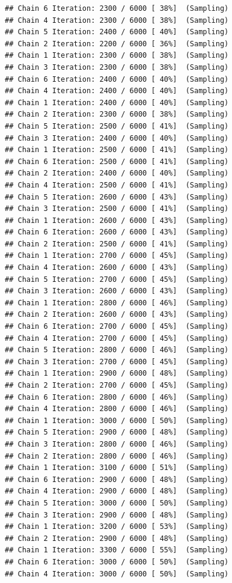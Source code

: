 \documentclass[
]{article}
\begin{document}
\begin{verbatim}
## Chain 6 Iteration: 2300 / 6000 [ 38%]  (Sampling) 
## Chain 4 Iteration: 2300 / 6000 [ 38%]  (Sampling) 
## Chain 5 Iteration: 2400 / 6000 [ 40%]  (Sampling) 
## Chain 2 Iteration: 2200 / 6000 [ 36%]  (Sampling) 
## Chain 1 Iteration: 2300 / 6000 [ 38%]  (Sampling) 
## Chain 3 Iteration: 2300 / 6000 [ 38%]  (Sampling) 
## Chain 6 Iteration: 2400 / 6000 [ 40%]  (Sampling) 
## Chain 4 Iteration: 2400 / 6000 [ 40%]  (Sampling) 
## Chain 1 Iteration: 2400 / 6000 [ 40%]  (Sampling) 
## Chain 2 Iteration: 2300 / 6000 [ 38%]  (Sampling) 
## Chain 5 Iteration: 2500 / 6000 [ 41%]  (Sampling) 
## Chain 3 Iteration: 2400 / 6000 [ 40%]  (Sampling) 
## Chain 1 Iteration: 2500 / 6000 [ 41%]  (Sampling) 
## Chain 6 Iteration: 2500 / 6000 [ 41%]  (Sampling) 
## Chain 2 Iteration: 2400 / 6000 [ 40%]  (Sampling) 
## Chain 4 Iteration: 2500 / 6000 [ 41%]  (Sampling) 
## Chain 5 Iteration: 2600 / 6000 [ 43%]  (Sampling) 
## Chain 3 Iteration: 2500 / 6000 [ 41%]  (Sampling) 
## Chain 1 Iteration: 2600 / 6000 [ 43%]  (Sampling) 
## Chain 6 Iteration: 2600 / 6000 [ 43%]  (Sampling) 
## Chain 2 Iteration: 2500 / 6000 [ 41%]  (Sampling) 
## Chain 1 Iteration: 2700 / 6000 [ 45%]  (Sampling) 
## Chain 4 Iteration: 2600 / 6000 [ 43%]  (Sampling) 
## Chain 5 Iteration: 2700 / 6000 [ 45%]  (Sampling) 
## Chain 3 Iteration: 2600 / 6000 [ 43%]  (Sampling) 
## Chain 1 Iteration: 2800 / 6000 [ 46%]  (Sampling) 
## Chain 2 Iteration: 2600 / 6000 [ 43%]  (Sampling) 
## Chain 6 Iteration: 2700 / 6000 [ 45%]  (Sampling) 
## Chain 4 Iteration: 2700 / 6000 [ 45%]  (Sampling) 
## Chain 5 Iteration: 2800 / 6000 [ 46%]  (Sampling) 
## Chain 3 Iteration: 2700 / 6000 [ 45%]  (Sampling) 
## Chain 1 Iteration: 2900 / 6000 [ 48%]  (Sampling) 
## Chain 2 Iteration: 2700 / 6000 [ 45%]  (Sampling) 
## Chain 6 Iteration: 2800 / 6000 [ 46%]  (Sampling) 
## Chain 4 Iteration: 2800 / 6000 [ 46%]  (Sampling) 
## Chain 1 Iteration: 3000 / 6000 [ 50%]  (Sampling) 
## Chain 5 Iteration: 2900 / 6000 [ 48%]  (Sampling) 
## Chain 3 Iteration: 2800 / 6000 [ 46%]  (Sampling) 
## Chain 2 Iteration: 2800 / 6000 [ 46%]  (Sampling) 
## Chain 1 Iteration: 3100 / 6000 [ 51%]  (Sampling) 
## Chain 6 Iteration: 2900 / 6000 [ 48%]  (Sampling) 
## Chain 4 Iteration: 2900 / 6000 [ 48%]  (Sampling) 
## Chain 5 Iteration: 3000 / 6000 [ 50%]  (Sampling) 
## Chain 3 Iteration: 2900 / 6000 [ 48%]  (Sampling) 
## Chain 1 Iteration: 3200 / 6000 [ 53%]  (Sampling) 
## Chain 2 Iteration: 2900 / 6000 [ 48%]  (Sampling) 
## Chain 1 Iteration: 3300 / 6000 [ 55%]  (Sampling) 
## Chain 6 Iteration: 3000 / 6000 [ 50%]  (Sampling) 
## Chain 4 Iteration: 3000 / 6000 [ 50%]  (Sampling) 

\end{verbatim}
\end{document}
